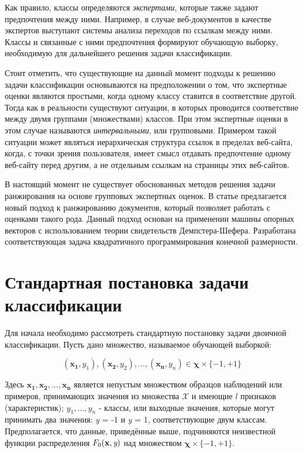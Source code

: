 \documentclass[12pt,a4paper,oneside]{article}
\begin{document}
\par
Как правило, классы определяются \emph{экспертами}, которые также задают предпочтения между ними. 
Например, в случае веб-документов в качестве экспертов выступают системы анализа переходов по ссылкам между ними. 
Классы и связанные с ними предпочтения формируют обучающую выборку, необходимую для дальнейшего решения задачи классификации. 

\par
Стоит отметить, что существующие на данный момент подходы к решению задачи классификации основываются на предположении о том, что экспертные оценки являются простыми, когда одному классу ставится в соответствие другой. 
Тогда как в реальности существуют ситуации, в которых проводится соответствие между двумя группами (множествами) классов. 
При этом экспертные оценки в этом случае называются \emph{интервальными}, или групповыми. 
Примером такой ситуации может являться иерархическая структура ссылок в пределах веб-сайта, когда, с точки зрения пользователя, имеет смысл отдавать предпочтение одному веб-сайту перед другим, а не отдельным ссылкам на страницы этих веб-сайтов. 

\par
В настоящий момент не существует обоснованных методов решения задачи ранжирования на основе групповых экспертных оценок. 
В статье предлагается новый подход к ранжированию документов, который позволяет работать с оценками такого рода. 
Данный подход основан на применении машины опорных векторов с использованием теории свидетельств Демпстера-Шефера. 
Разработана соответствующая задача квадратичного программирования конечной размерности. 


\section{Стандартная постановка задачи классификации}
\label{sec:standard_classification_problem}

\par
Для начала необходимо рассмотреть стандартную постановку задачи двоичной классификации.
Пусть дано множество, называемое обучающей выборкой:

\[
(\mathbf{x_1}, y_1),(\mathbf{x_2}, y_2), \dots, (\mathbf{x_n}, y_n) \in \mathbf{\chi} \times \{-1,+1\}
\]

\par
Здесь \(\mathbf{x_1}, \mathbf{x_2}, \dots, \mathbf{x_n}\) является непустым множеством образцов наблюдений или примеров, принимающих значения из множества \(\mathcal{X}\) и имеющие $l$ признаков (характеристик); \(y_1, \dots, y_n\) - классы, или выходные значения, которые могут принимать два значения: \emph{y} = -1 и \emph{y} = 1, соответствующие двум классам. 
Предполагается, что данные, приведённые выше, подчиняются неизвестной функции распределения \(F_0(\mathbf{x}, \emph{y})\) над множеством \(\mathbf{\chi} \times \{-1, +1\}\). 
\end{document}
